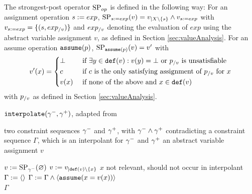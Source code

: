 The strongest-post operator $\text{SP}_{op}$ is defined in the following way:
For an assignment operation $s := exp$, $\text{SP}_{s := exp}(v) = v_{|X \setminus \{ s \}} \wedge v_{s := exp}$ with $v_{s := exp} = \{ (s, exp_{/v}) \}$ and $exp_{/v}$ denoting the evaluation of $exp$ using the abstract variable assignment $v$, as defined in Section \ref{sec:valueAnalysis}.
For an assume operation $\texttt{assume}(p)$, 
	$\text{SP}_{\texttt{assume}(p)}(v) = v'$ with 
	\[ v'(x) = \begin{dcases}
		\bot & \text{ if } \exists y \in \texttt{def}(v) : v(y) = \bot \text{ or } p_{/v} \text{ is unsatisfiable}\\
		c & \text{ if $c$ is the only satisfying assignment of $p_{/v}$ for $x$}\\
		v(x) & \text{ if none of the above and } x \in \texttt{def}(v)
	\end{dcases}\]
	with $p_{/v}$ as defined in Section \ref{sec:valueAnalysis}.

\begin{algorithm}[t]
\caption{$\texttt{interpolate}({\gamma^{-}}, {\gamma^{+}})$, adapted from \cite{Beyer2013}}
\label{alg:interpolateExplicit}
\begin{algorithmic}[1]
\Input two constraint sequences ${\gamma^{-}}$ and ${\gamma^{+}}$, with ${\gamma^{-}} \wedge {\gamma^{+}}$ contradicting
\Output a constraint sequence $\Gamma$, which is an interpolant for ${\gamma^{-}}$ and ${\gamma^{+}}$
\Variables an abstract variable assignment $v$

\State $v := \text{SP}_{\gamma^{-}}(\varnothing)$
		\State $v := v_{|\texttt{def}(v) \setminus \{x\}}$ \Comment $x$ not relevant, should not occur in interpolant
	\EndIf
\EndFor
\State $\Gamma := \langle \rangle$
 \label{alg:interpolateExplicit:itpStart}
	\State $\Gamma := \Gamma \wedge \langle \texttt{assume}(x = v(x))\rangle$
\EndFor\\ \label{alg:interpolateExplicit:itpFinish}
\Return $\Gamma$
\end{algorithmic}
\end{algorithm}

